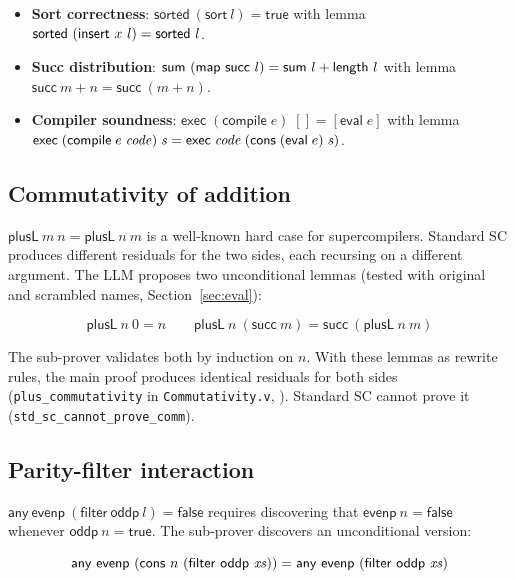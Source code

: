 \begin{itemize}[leftmargin=*]
\item \textbf{Sort correctness}: $\mathsf{sorted}\ (\mathsf{sort}\ l) = \mathsf{true}$
  with lemma $\mathsf{sorted}\ (\mathsf{insert}\ x\ l) = \mathsf{sorted}\ l$.
\item \textbf{Succ distribution}: $\mathsf{sum}\ (\mathsf{map}\ \mathsf{succ}\ l)
  = \mathsf{sum}\ l + \mathsf{length}\ l$ with lemma
  $\mathsf{succ}\ m + n = \mathsf{succ}\ (m + n)$.
\item \textbf{Compiler soundness}: $\mathsf{exec}\;(\mathsf{compile}\;e)\;[] =
  [\mathsf{eval}\;e]$ with lemma $\mathsf{exec}\;(\mathsf{compile}\;e\;\mathit{code})\;\mathit{s}
  = \mathsf{exec}\;\mathit{code}\;(\mathsf{cons}\;(\mathsf{eval}\;e)\;\mathit{s})$.
\end{itemize}

\subsection{Commutativity of addition}

$\mathsf{plusL}\ m\ n = \mathsf{plusL}\ n\ m$ is a well-known hard case for
supercompilers.  Standard SC produces different residuals for the two
sides, each recursing on a different argument.  The LLM proposes two
unconditional lemmas (tested with original and scrambled names,
Section~\ref{sec:eval}):

\[
\mathsf{plusL}\ n\ 0 = n
\qquad
\mathsf{plusL}\ n\ (\mathsf{succ}\ m) = \mathsf{succ}\ (\mathsf{plusL}\ n\ m)
\]

The sub-prover validates both by induction on $n$.  With these lemmas as
rewrite rules, the main proof produces identical residuals for both sides
(\texttt{plus\_commutativity} in \texttt{Commutativity.v},
\vmcompute{}).  Standard SC cannot prove it
(\texttt{std\_sc\_cannot\_prove\_comm}).

\subsection{Parity-filter interaction}

$\mathsf{any}\ \mathsf{evenp}\ (\mathsf{filter}\ \mathsf{oddp}\ l)
= \mathsf{false}$ requires discovering that $\mathsf{evenp}\ n =
\mathsf{false}$ whenever $\mathsf{oddp}\ n = \mathsf{true}$.  The sub-prover
discovers an unconditional version:

\[
\mathsf{any}\ \mathsf{evenp}\ (\cons\ n\ (\mathsf{filter}\ \mathsf{oddp}\ \mathit{xs}))
= \mathsf{any}\ \mathsf{evenp}\ (\mathsf{filter}\ \mathsf{oddp}\ \mathit{xs})
\]

